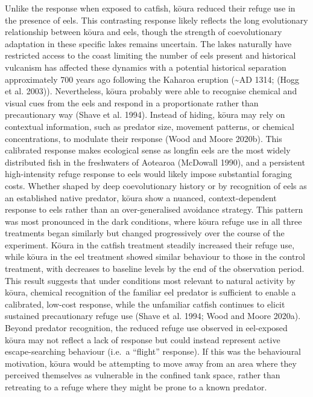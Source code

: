 \documentclass[
  12pt,
  a4paper,
]{scrbook}
\begin{document}
Unlike the response when exposed to catfish, kōura reduced their refuge
use in the presence of eels. This contrasting response likely reflects
the long evolutionary relationship between kōura and eels, though the
strength of coevolutionary adaptation in these specific lakes remains
uncertain. The lakes naturally have restricted access to the coast
limiting the number of eels present and historical vulcanism has
affected these dynamics with a potential historical separation
approximately 700 years ago following the Kaharoa eruption
(\textasciitilde AD 1314; (Hogg et al. 2003)). Nevertheless, kōura
probably were able to recognise chemical and visual cues from the eels
and respond in a proportionate rather than precautionary way (Shave et
al. 1994). Instead of hiding, kōura may rely on contextual information,
such as predator size, movement patterns, or chemical concentrations, to
modulate their response (Wood and Moore 2020b). This calibrated response
makes ecological sense as longfin eels are the most widely distributed
fish in the freshwaters of Aotearoa (McDowall 1990), and a persistent
high-intensity refuge response to eels would likely impose substantial
foraging costs. Whether shaped by deep coevolutionary history or by
recognition of eels as an established native predator, kōura show a
nuanced, context-dependent response to eels rather than an
over-generalised avoidance strategy. This pattern was most pronounced in
the dark conditions, where kōura refuge use in all three treatments
began similarly but changed progressively over the course of the
experiment. Kōura in the catfish treatment steadily increased their
refuge use, while kōura in the eel treatment showed similar behaviour to
those in the control treatment, with decreases to baseline levels by the
end of the observation period. This result suggests that under
conditions most relevant to natural activity by kōura, chemical
recognition of the familiar eel predator is sufficient to enable a
calibrated, low-cost response, while the unfamiliar catfish continues to
elicit sustained precautionary refuge use (Shave et al. 1994; Wood and
Moore 2020a). Beyond predator recognition, the reduced refuge use
observed in eel-exposed kōura may not reflect a lack of response but
could instead represent active escape-searching behaviour (i.e.~a
``flight'' response). If this was the behavioural motivation, kōura
would be attempting to move away from an area where they perceived
themselves as vulnerable in the confined tank space, rather than
retreating to a refuge where they might be prone to a known predator.
\end{document}
